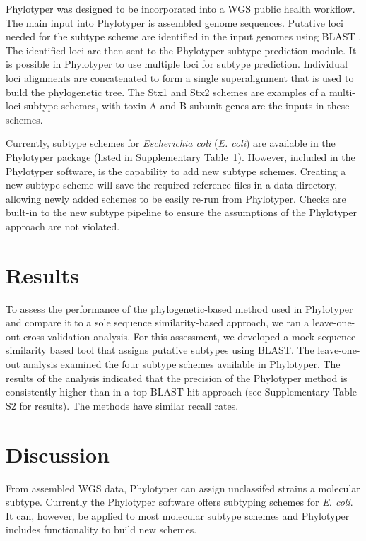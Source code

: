 \documentclass{bioinfo}
\begin{document}
Phylotyper was designed to be incorporated into a WGS public health workflow.  
The main input into Phylotyper is assembled genome sequences.  
Putative loci needed for the subtype scheme are identified in the input genomes using BLAST \citep{Camacho2009}.
The identified loci are then sent to the Phylotyper subtype prediction module.
It is possible in Phylotyper to use multiple loci for subtype prediction.
Individual loci alignments are concatenated to form a single superalignment that is used to build the phylogenetic tree.  
The Stx1 and Stx2 schemes are examples of a multi-loci subtype schemes, with toxin A and B subunit genes are the inputs in these schemes.

Currently, subtype schemes for \emph{Escherichia coli} (\textit{E. coli}) are available in the Phylotyper package (listed in Supplementary Table~1).
However, included in the Phylotyper software, is the capability to add new subtype schemes. 
Creating a new subtype scheme will save the required reference files in a data directory, allowing newly added schemes to be easily re-run from Phylotyper.
Checks are built-in to the new subtype pipeline to ensure the assumptions of the Phylotyper approach are not violated.  

\section{Results}

To assess the performance of the phylogenetic-based method used in Phylotyper and compare it to a sole sequence similarity-based approach, we ran a leave-one-out cross validation analysis.
For this assessment, we developed a mock sequence-similarity based tool that assigns putative subtypes using BLAST.
The leave-one-out analysis examined the four subtype schemes available in Phylotyper. The results of the analysis indicated that the precision of the Phylotyper method is consistently higher than in a top-BLAST hit approach (see Supplementary Table S2 for results). The methods have similar recall rates.

\section{Discussion}

From assembled WGS data, Phylotyper can assign unclassifed strains a molecular subtype.
Currently the Phylotyper software offers subtyping schemes for \textit{E. coli}.
It can, however, be applied to most molecular subtype schemes and Phylotyper includes functionality to build new schemes.
\end{document}
